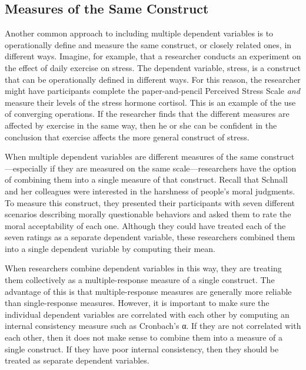 \documentclass[
]{krantz}
\begin{document}
\hypertarget{measures-of-the-same-construct}{%
\subsection*{Measures of the Same Construct}\label{measures-of-the-same-construct}}


Another common approach to including multiple dependent variables is to operationally define and measure the same construct, or closely related ones, in different ways. Imagine, for example, that a researcher conducts an experiment on the effect of daily exercise on stress. The dependent variable, stress, is a construct that can be operationally defined in different ways. For this reason, the researcher might have participants complete the paper-and-pencil Perceived Stress Scale \emph{and} measure their levels of the stress hormone cortisol. This is an example of the use of converging operations. If the researcher finds that the different measures are affected by exercise in the same way, then he or she can be confident in the conclusion that exercise affects the more general construct of stress.

When multiple dependent variables are different measures of the same construct---especially if they are measured on the same scale---researchers have the option of combining them into a single measure of that construct. Recall that Schnall and her colleagues were interested in the harshness of people's moral judgments. To measure this construct, they presented their participants with seven different scenarios describing morally questionable behaviors and asked them to rate the moral acceptability of each one. Although they could have treated each of the seven ratings as a separate dependent variable, these researchers combined them into a single dependent variable by computing their mean.

When researchers combine dependent variables in this way, they are treating them collectively as a multiple-response measure of a single construct. The advantage of this is that multiple-response measures are generally more reliable than single-response measures. However, it is important to make sure the individual dependent variables are correlated with each other by computing an internal consistency measure such as Cronbach's α. If they are not correlated with each other, then it does not make sense to combine them into a measure of a single construct. If they have poor internal consistency, then they should be treated as separate dependent variables.
\end{document}
